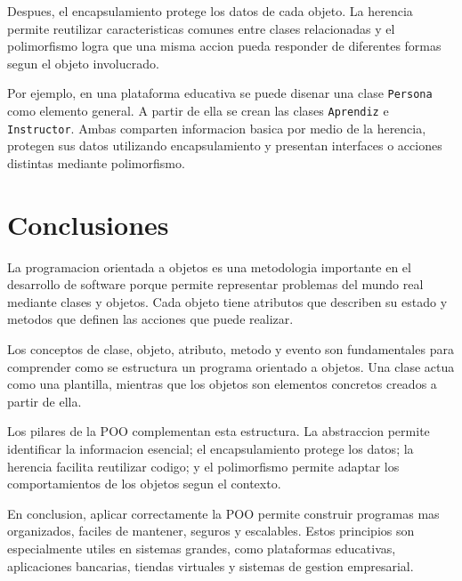 \documentclass[12pt,letterpaper]{article}
\begin{document}
Despues, el encapsulamiento protege los datos de cada objeto. La herencia permite reutilizar caracteristicas comunes entre clases relacionadas y el polimorfismo logra que una misma accion pueda responder de diferentes formas segun el objeto involucrado.

Por ejemplo, en una plataforma educativa se puede disenar una clase \texttt{Persona} como elemento general. A partir de ella se crean las clases \texttt{Aprendiz} e \texttt{Instructor}. Ambas comparten informacion basica por medio de la herencia, protegen sus datos utilizando encapsulamiento y presentan interfaces o acciones distintas mediante polimorfismo.

\section{Conclusiones}

La programacion orientada a objetos es una metodologia importante en el desarrollo de software porque permite representar problemas del mundo real mediante clases y objetos. Cada objeto tiene atributos que describen su estado y metodos que definen las acciones que puede realizar.

Los conceptos de clase, objeto, atributo, metodo y evento son fundamentales para comprender como se estructura un programa orientado a objetos. Una clase actua como una plantilla, mientras que los objetos son elementos concretos creados a partir de ella.

Los pilares de la POO complementan esta estructura. La abstraccion permite identificar la informacion esencial; el encapsulamiento protege los datos; la herencia facilita reutilizar codigo; y el polimorfismo permite adaptar los comportamientos de los objetos segun el contexto.

En conclusion, aplicar correctamente la POO permite construir programas mas organizados, faciles de mantener, seguros y escalables. Estos principios son especialmente utiles en sistemas grandes, como plataformas educativas, aplicaciones bancarias, tiendas virtuales y sistemas de gestion empresarial.

\printbibliography[title={Referencias}]
\end{document}
